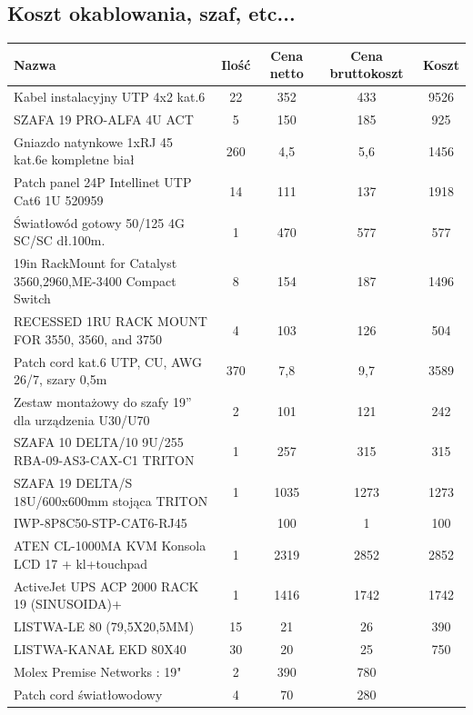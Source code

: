 \subsection{Koszt okablowania, szaf, etc...}
\begin{center}
    \begin{tabular}{|p{6cm}|c|c|c|c|}
    \hline
Nazwa &	Ilość	&Cena netto	&Cena bruttokoszt	&Koszt \\ \hline
Kabel instalacyjny UTP 4x2 kat.6	&22&	352	&433	&9526\\ \hline
SZAFA 19 PRO-ALFA 4U ACT	&5	&150	&185	&925\\ \hline
Gniazdo natynkowe 1xRJ 45 kat.6e kompletne biał	&260	&4,5	&5,6	&1456\\ \hline
Patch panel 24P Intellinet UTP Cat6 1U 520959	&14	&111	&137	&1918\\ \hline
Światłowód gotowy 50/125 4G SC/SC dł.100m.	&1&	470&	577&	577\\ \hline
19in RackMount for Catalyst 3560,2960,ME-3400 Compact Switch	&8	&154	&187	&1496\\ \hline
RECESSED 1RU RACK MOUNT FOR 3550, 3560, and 3750	&4	&103	&126	&504\\ \hline
Patch cord kat.6 UTP, CU, AWG 26/7, szary 0,5m&	370&	7,8&	9,7&	3589\\ \hline
Zestaw montażowy do szafy 19” dla urządzenia U30/U70	&2	&101	&121	&242\\ \hline
SZAFA 10 DELTA/10 9U/255 RBA-09-AS3-CAX-C1 TRITON	&1	&257	&315	&315\\ \hline
SZAFA 19 DELTA/S 18U/600x600mm stojąca TRITON	&1	&1035	&1273	&1273 \\ \hline
IWP-8P8C50-STP-CAT6-RJ45&	&100		&1	&100\\ \hline
ATEN CL-1000MA KVM Konsola LCD 17 + kl+touchpad	&1	&2319	&2852	&2852 \\ \hline
ActiveJet UPS ACP 2000 RACK 19 (SINUSOIDA)+	&1	&1416	&1742	&1742 \\ \hline
LISTWA-LE 80  (79,5X20,5MM)&15	& 21 	&26	&390 \\ \hline
LISTWA-KANAŁ EKD 80X40	& 30	& 20 & 25	&750 \\ \hline
Molex Premise Networks : 19"	&2	&	390&	780\\ \hline
Patch cord światłowodowy	&4		&70	&280\\ \hline
\end{tabular}
\end{center}

